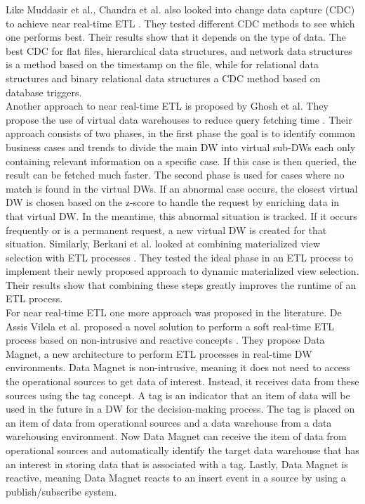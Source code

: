 \documentclass[11pt]{article}
\begin{document}
Like Muddasir et al., Chandra et al. also looked into change data capture (CDC) to achieve near real-time ETL \cite{Chandra2018}. They tested different CDC methods to see which one performs best. Their results show that it depends on the type of data. The best CDC for flat files, hierarchical data structures, and network data structures is a method based on the timestamp on the file, while for relational data structures and binary relational data structures a CDC method based on database triggers. \\

Another approach to near real-time ETL is proposed by Ghosh et al. They propose the use of virtual data warehouses to reduce query fetching time \cite{Ghosh2021585}. Their approach consists of two phases, in the first phase the goal is to identify common business cases and trends to divide the main DW into virtual sub-DWs each only containing relevant information on a specific case. If this case is then queried, the result can be fetched much faster. The second phase is used for cases where no match is found in the virtual DWs. If an abnormal case occurs, the closest virtual DW is chosen based on the z-score to handle the request by enriching data in that virtual DW. In the meantime, this abnormal situation is tracked. If it occurs frequently or is a permanent request, a new virtual DW is created for that situation. Similarly, Berkani et al. looked at combining materialized view selection with ETL processes \cite{Berkani20181ETL}. They tested the ideal phase in an ETL process to implement their newly proposed approach to dynamic materialized view selection. Their results show that combining these steps greatly improves the runtime of an ETL process. \\

For near real-time ETL one more approach was proposed in the literature. De Assis Vilela et al. proposed a novel solution to perform a soft real-time ETL process based on non-intrusive and reactive concepts \cite{DeAssisVilela2021556}. They propose Data Magnet, a new architecture to perform ETL processes in real-time DW environments. Data Magnet is non-intrusive, meaning it does not need to access the operational sources to get data of interest. Instead, it receives data from these sources using the tag concept. A tag is an indicator that an item of data will be used in the future in a DW for the decision-making process. The tag is placed on an item of data from operational sources and a data warehouse from a data warehousing environment. Now Data Magnet can receive the item of data from operational sources and automatically identify the target data warehouse that has an interest in storing data that is associated with a tag. Lastly, Data Magnet is reactive, meaning Data Magnet reacts to an insert event in a source by using a publish/subscribe system. \\
\end{document}
